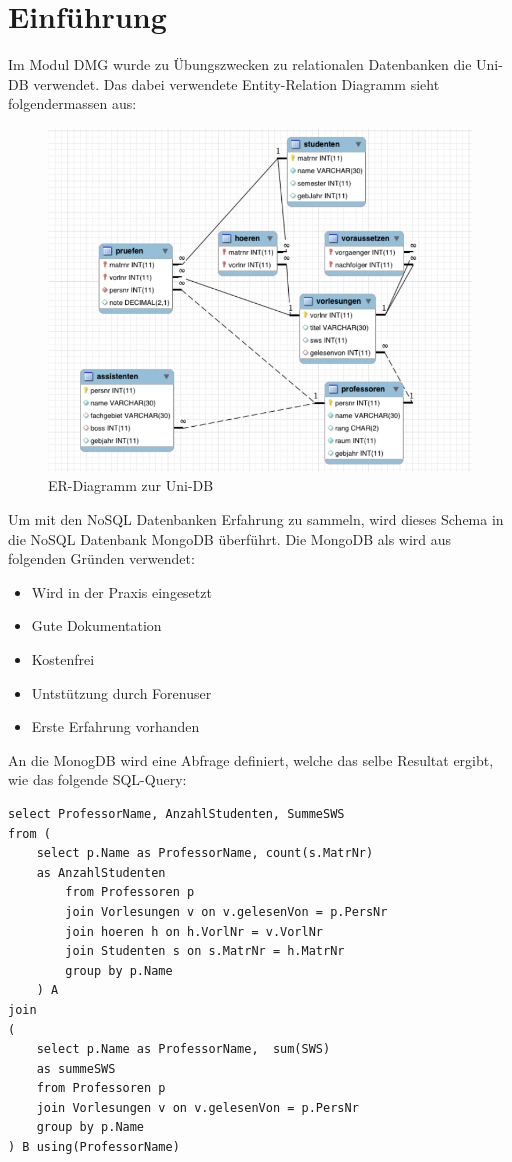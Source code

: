 \section{Einführung}
Im Modul DMG wurde zu Übungszwecken zu relationalen Datenbanken die Uni-DB 
verwendet. Das dabei verwendete Entity-Relation Diagramm sieht folgendermassen
aus:
\begin{figure}[htbp] 
  \centering
     \includegraphics[width=1\textwidth]{./pictures/SQL-DB_ER_Diagramm_UNI-DB.png}
  \caption{ER-Diagramm zur Uni-DB \cite{Kaufmann2016}}
  \label{fig:uni-db}
\end{figure}
 Um mit den NoSQL Datenbanken Erfahrung zu sammeln, wird dieses Schema in die NoSQL Datenbank MongoDB überführt.
Die MongoDB als wird aus folgenden Gründen verwendet:
\begin{itemize}
  \item Wird in der Praxis eingesetzt
  \item Gute Dokumentation
  \item Kostenfrei
  \item Untstützung durch Forenuser
  \item Erste Erfahrung vorhanden
\end{itemize}
An die MonogDB wird eine Abfrage definiert, welche das selbe Resultat ergibt,
wie das folgende SQL-Query:
\begin{lstlisting}
select ProfessorName, AnzahlStudenten, SummeSWS 
from ( 
	select p.Name as ProfessorName, count(s.MatrNr) 
	as AnzahlStudenten 
		from Professoren p 
		join Vorlesungen v on v.gelesenVon = p.PersNr
		join hoeren h on h.VorlNr = v.VorlNr 
		join Studenten s on s.MatrNr = h.MatrNr 
		group by p.Name 
	) A 
join 
( 
	select p.Name as ProfessorName,  sum(SWS) 
	as summeSWS 
	from Professoren p 
	join Vorlesungen v on v.gelesenVon = p.PersNr 
	group by p.Name 
) B using(ProfessorName)
\end{lstlisting}

